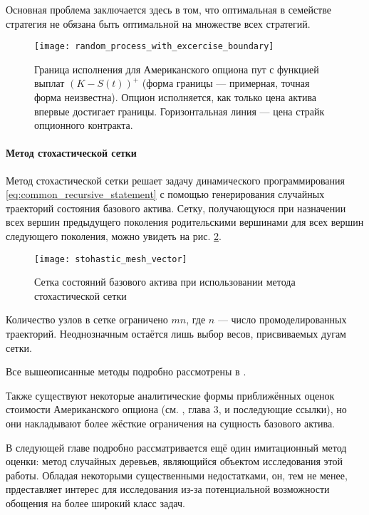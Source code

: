 Основная проблема заключается здесь в том, что оптимальная в семействе стратегия не обязана быть оптимальной на множестве всех стратегий.
\begin{figure}[htb]
\centering
\texttt{[image: random\_process\_with\_excercise\_boundary]}
\caption{Граница исполнения для Американского опциона пут с функцией выплат $\left(K-S(t)\right)^+$ (форма границы --- примерная, точная форма неизвестна). Опцион исполняется, как только цена актива впервые достигает границы. Горизонтальная линия --- цена страйк опционного контракта.}
\label{fig:excercise_boundary}
\end{figure}

\paragraph{Метод стохастической сетки}
Метод стохастической сетки решает задачу динамического программирования \eqref{eq:common_recursive_statement} с помощью генерирования случайных траекторий состояния базового актива. Сетку, получающуюся при назначении всех вершин предыдущего поколения родительскими вершинами для всех вершин следующего поколения, можно увидеть на рис. \ref{fig:stohastic_mesh}.
\begin{figure}[htbp]
\centering
\texttt{[image: stohastic\_mesh\_vector]}
\caption{Сетка состояний базового актива при использовании метода стохастической сетки}
\label{fig:stohastic_mesh}
\end{figure}
Количество узлов в сетке ограничено $mn$, где $n$ --- число промоделированных траекторий. Неоднозначным остаётся лишь выбор весов, присвиваемых дугам сетки.

Все вышеописанные методы подробно рассмотрены в \cite{Glasserman2004}.

Также существуют некоторые аналитические формы приближённых оценок стоимости Американского опциона (см. \cite{Haug2007}, глава 3, и последующие ссылки), но они накладывают более жёсткие ограничения на сущность базового актива.

В следующей главе подробно рассматривается ещё один имитационный метод оценки: метод случайных деревьев, являющийся объектом исследования этой работы. Обладая некоторыми существенными недостатками, он, тем не менее, прдеставляет интерес для исследования из-за потенциальной возможности обощения на более широкий класс задач.
